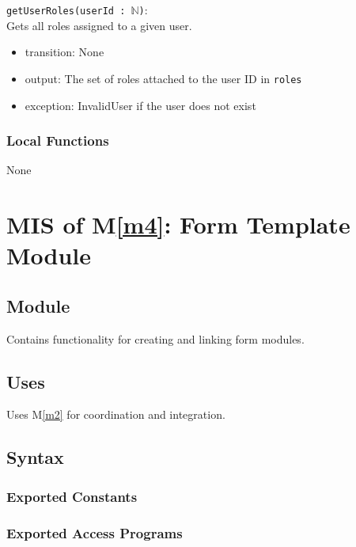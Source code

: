 \documentclass[12pt, titlepage]{article}
\begin{document}
\noindent \texttt{getUserRoles(userId : $\mathbb{N}$)}: \\
Gets all roles assigned to a given user.
\begin{itemize}
\item transition: None
\item output: The set of roles attached to the user ID in \texttt{roles}
\item exception: InvalidUser if the user does not exist
\end{itemize}

\subsubsection{Local Functions}

None

\newpage

\section{MIS of M\ref{m4}: Form Template Module}

\subsection{Module}

Contains functionality for creating and linking form modules.

\subsection{Uses}

Uses M\ref{m2} for coordination and integration.

\subsection{Syntax}

\subsubsection{Exported Constants}

\subsubsection{Exported Access Programs}
\end{document}
